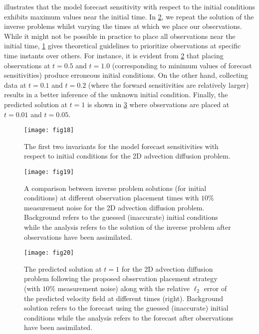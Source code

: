 \documentclass{article}
\begin{document}
\textcolor{rev}{ illustrates that the model forecast sensitivity with respect to the initial conditions exhibits maximum values near the initial time. In \cref{fig:ad_ic}, we repeat the solution of the inverse problems whilst varying the times at which we place our observations. While it might not be possible in practice to place all observations near the initial time, \cref{fig:ad_sens} gives theoretical guidelines to prioritize observations at specific time instants over others. For instance, it is evident from \cref{fig:ad_ic} that placing observations at $t=0.5$ and $t=1.0$ (corresponding to minimum values of forecast sensitivities) produce erroneous initial conditions. On the other hand, collecting data at $t=0.1$ and $t=0.2$ (where the forward sensitivities are relatively larger) results in a better inference of the unknown initial condition. Finally, the predicted solution at $t=1$ is shown in \cref{fig:ad_pred} where observations are placed at $t=0.01$ and $t=0.05$.}

\begin{figure}[ht!]
    \centering
    \texttt{[image: fig18]}
    \caption{\textcolor{rev}{The first two invariants for the model forecast sensitivities with respect to initial conditions for the 2D advection diffusion problem.}}
    \label{fig:ad_sens}
\end{figure}

\begin{figure}[ht!]
    \centering
    \texttt{[image: fig19]}
    \caption{\textcolor{rev2}{A comparison between inverse problem solutions (for initial conditions) at different observation placement times with $10\%$ measurement noise for the 2D advection diffusion problem. Background refers to the guessed (inaccurate) initial conditions while the analysis refers to the solution of the inverse problem after observations have been assimilated.}}
    \label{fig:ad_ic}
\end{figure}

\begin{figure}[ht!]
    \centering
    \texttt{[image: fig20]}
    \caption{\textcolor{rev2}{The predicted solution at $t=1$ for the 2D advection diffusion problem following the proposed observation placement strategy (with $10\%$ measurement noise) along with the relative $\ell_2$ error of the predicted velocity field at different times (right). Background solution refers to the forecast using the guessed (inaccurate) initial conditions while the analysis refers to the forecast after observations have been assimilated.}}
    \label{fig:ad_pred}
\end{figure}
\end{document}
